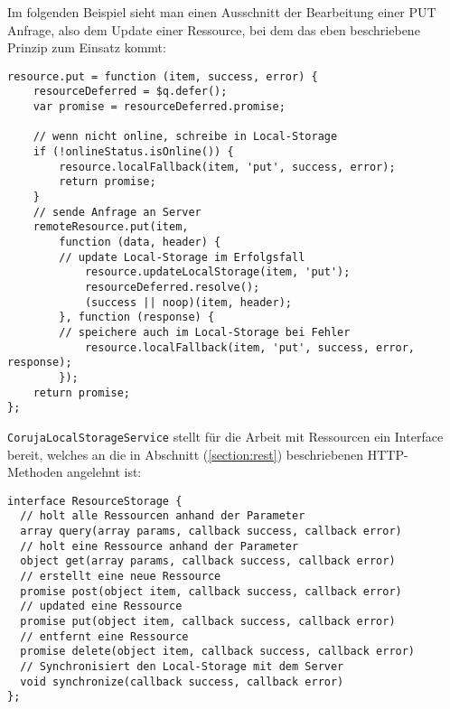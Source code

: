 Im folgenden Beispiel sieht man einen Ausschnitt der Bearbeitung einer PUT Anfrage, also dem Update einer Ressource, bei dem das eben beschriebene Prinzip zum Einsatz kommt:
\begin{lstlisting}
resource.put = function (item, success, error) {
    resourceDeferred = $q.defer();
    var promise = resourceDeferred.promise;

    // wenn nicht online, schreibe in Local-Storage
    if (!onlineStatus.isOnline()) {
        resource.localFallback(item, 'put', success, error);
        return promise;
    }
    // sende Anfrage an Server
    remoteResource.put(item,
        function (data, header) {
	    // update Local-Storage im Erfolgsfall
            resource.updateLocalStorage(item, 'put');
            resourceDeferred.resolve();
            (success || noop)(item, header);
        }, function (response) {
	    // speichere auch im Local-Storage bei Fehler
            resource.localFallback(item, 'put', success, error, response);
        });
    return promise;
}; 
\end{lstlisting}
\texttt{CorujaLocalStorageService} stellt für die Arbeit mit Ressourcen ein Interface bereit, welches an die in Abschnitt (\ref{section:rest}) beschriebenen HTTP-Methoden angelehnt ist:
\begin{lstlisting}           
interface ResourceStorage {
  // holt alle Ressourcen anhand der Parameter
  array query(array params, callback success, callback error)
  // holt eine Ressource anhand der Parameter
  object get(array params, callback success, callback error)  
  // erstellt eine neue Ressource
  promise post(object item, callback success, callback error)
  // updated eine Ressource
  promise put(object item, callback success, callback error) 
  // entfernt eine Ressource
  promise delete(object item, callback success, callback error) 
  // Synchronisiert den Local-Storage mit dem Server
  void synchronize(callback success, callback error)
};             
\end{lstlisting}

